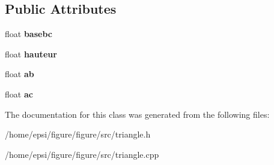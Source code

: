 \subsection*{Public Attributes}
\begin{DoxyCompactItemize}
\item 
\mbox{\label{classtriangle_a9ed10544b194df91065464230384aaaf}} 
float {\bfseries basebc}
\item 
\mbox{\label{classtriangle_ae42cf8cc51203613bb6e2f6d5628763c}} 
float {\bfseries hauteur}
\item 
\mbox{\label{classtriangle_a61b7d49c873cb8d4cabdde86c3fc66bf}} 
float {\bfseries ab}
\item 
\mbox{\label{classtriangle_abdee7cb1c7db557c13bfd0f7791fcdcc}} 
float {\bfseries ac}
\end{DoxyCompactItemize}


The documentation for this class was generated from the following files\+:\begin{DoxyCompactItemize}
\item 
/home/epsi/figure/figure/src/triangle.\+h\item 
/home/epsi/figure/figure/src/triangle.\+cpp\end{DoxyCompactItemize}
